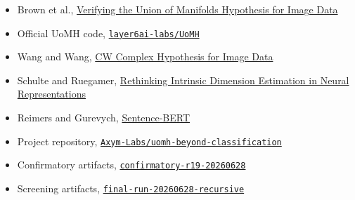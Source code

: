 \documentclass[11pt]{article}
\begin{document}
\begin{itemize}
\tightlist
\item
  Brown et al., \href{https://arxiv.org/abs/2207.02862}{Verifying the Union of Manifolds Hypothesis for Image Data}
\item
  Official UoMH code, \href{https://github.com/layer6ai-labs/UoMH}{\texttt{layer6ai-labs/UoMH}}
\item
  Wang and Wang, \href{https://proceedings.mlr.press/v235/wang24bs.html}{CW Complex Hypothesis for Image Data}
\item
  Schulte and Ruegamer, \href{https://arxiv.org/abs/2604.20276}{Rethinking Intrinsic Dimension Estimation in Neural Representations}
\item
  Reimers and Gurevych, \href{https://arxiv.org/abs/1908.10084}{Sentence-BERT}
\item
  Project repository, \href{https://github.com/Axym-Labs/uomh-beyond-classification}{\texttt{Axym-Labs/uomh-beyond-classification}}
\item
  Confirmatory artifacts, \href{https://github.com/Axym-Labs/uomh-beyond-classification/tree/main/docs/recursive-uomh-protocol/artifacts/confirmatory-r19-20260628}{\texttt{confirmatory-r19-20260628}}
\item
  Screening artifacts, \href{https://github.com/Axym-Labs/uomh-beyond-classification/tree/main/docs/recursive-uomh-protocol/artifacts/final-run-20260628-recursive}{\texttt{final-run-20260628-recursive}}
\end{itemize}
\end{document}
